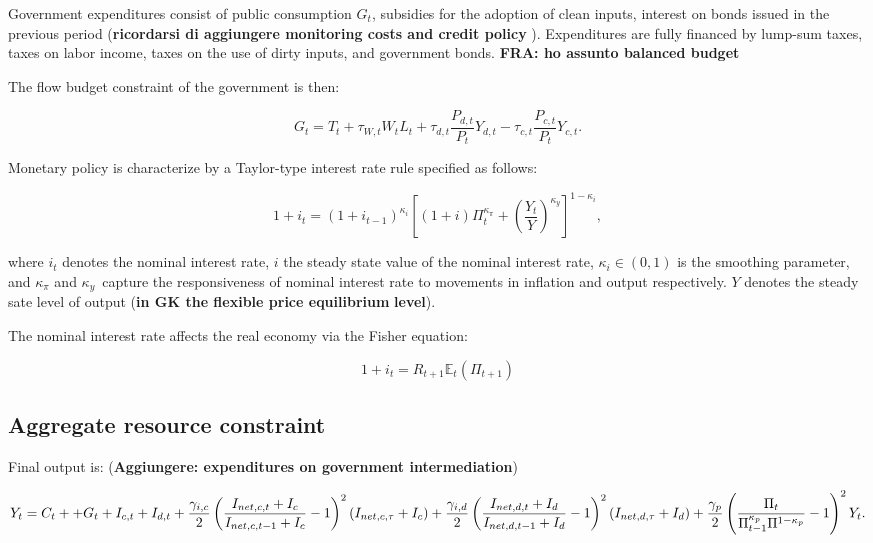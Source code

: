 \documentclass{article}
\begin{document}
Government expenditures consist of public consumption $G_{t}$, subsidies for
the adoption of clean inputs, interest on bonds issued in the previous
period (\textbf{ricordarsi di aggiungere monitoring costs and credit policy}%
). Expenditures are fully financed by lump-sum taxes, taxes on labor income,
taxes on the use of dirty inputs, and government bonds. \textbf{FRA: ho
assunto balanced budget}

The flow budget constraint of the government is then:

\begin{equation*}
G_{t}=T_{t}+\tau _{W,t}W_{t}L_{t}+\tau _{d,t}\frac{P_{d,t}}{P_{t}}%
Y_{d,t}-\tau _{c,t}\frac{P_{c,t}}{P_{t}}Y_{c,t}.
\end{equation*}

Monetary policy is characterize by a Taylor-type interest rate rule
specified as follows:

\begin{equation*}
1+i_{t}=(1+i_{t-1})^{\kappa _{i}}\left[ (1+i)\Pi _{t}^{\kappa _{\pi
}}+\left( \frac{Y_{t}}{Y}\right) ^{\kappa _{y}}\right] ^{1-\kappa _{i}},
\end{equation*}

where $i_{t}$ denotes the nominal interest rate, $i$ the steady state value
of the nominal interest rate, $\kappa _{i}\in (0,1)$ is the smoothing
parameter, and $\kappa _{\pi }$ and $\kappa _{y}$\ capture the
responsiveness of nominal interest rate to movements in inflation and output
respectively. $Y$ denotes the steady sate level of output (\textbf{in GK the
flexible price equilibrium} \textbf{level}).

The nominal interest rate affects the real economy via the Fisher equation:

\begin{equation*}
1+i_{t}=R_{t+1}\mathbb{E}_{t}(\Pi _{t+1})
\end{equation*}

\subsection{Aggregate resource constraint}

Final output is: (\textbf{Aggiungere: expenditures on government
intermediation})

\begin{equation*}
Y_{t}=C_{t}++G_{t}+I_{c,t}+I_{d,t}+\frac{\gamma _{i,c}}{2}\left( \frac{%
I_{net,c,t}+I_{c}}{I_{net,c,t-1}+I_{c}}-1\right) ^{2}\left( I_{net,c,\tau
}+I_{c}\right) +\frac{\gamma _{i,d}}{2}\left( \frac{I_{net,d,t}+I_{d}}{%
I_{net,d,t-1}+I_{d}}-1\right) ^{2}\left( I_{net,d,\tau }+I_{d}\right) +\frac{%
\gamma _{p}}{2}\left( \frac{\Pi _{t}}{\Pi _{t-1}^{\kappa _{p}}\Pi ^{1-\kappa
_{p}}}-1\right) ^{2}Y_{t}.
\end{equation*}
\end{document}
